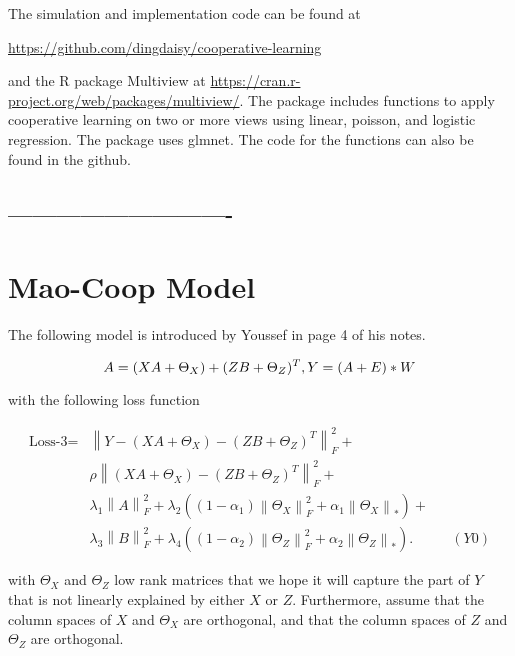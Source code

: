 \documentclass[
]{article}
\begin{document}
The simulation and implementation code can be found at

\url{https://github.com/dingdaisy/cooperative-learning}

and the R package Multiview at
\url{https://cran.r-project.org/web/packages/multiview/}. The package
includes functions to apply cooperative learning on two or more views
using linear, poisson, and logistic regression. The package uses glmnet.
The code for the functions can also be found in the github.

\hypertarget{section}{%
\subsection{----------------------------}\label{section}}

\hypertarget{mao-coop-model}{%
\section{Mao-Coop Model}\label{mao-coop-model}}

The following model is introduced by Youssef in page 4 of his notes.

\begin{equation}
    A = (XA + \Theta_X) + (ZB + \Theta_Z)^T,\\
    Y = (A+E) * W
\end{equation}

with the following loss function

\[
\begin{align}
    \text{Loss-3} =& \left\|  Y - (XA + \Theta_X) - (ZB + \Theta_Z)^T \right\|_F^2 +\\& \rho \left\| (XA + \Theta_X) - (ZB + \Theta_Z)^T \right\|_F^2 +\\
    & \lambda_1 \left\| A \right\|_F^2 + \lambda_2 \left( (1 - \alpha_1) \left\| \Theta_X \right\|_F^2 + \alpha_1 \left\| \Theta_X \right\|_* \right)+\\
    & \lambda_3 \left\| B \right\|_F^2 + \lambda_4 \left( (1 - \alpha_2) \left\| \Theta_Z \right\|_F^2 + \alpha_2 \left\| \Theta_Z \right\|_* \right).&&(Y0)
\end{align}
\]

with \(\Theta_X\) and \(\Theta_Z\) low rank matrices that we hope it
will capture the part of \(Y\) that is not linearly explained by either
\(X\) or \(Z\). Furthermore, assume that the column spaces of \(X\) and
\(\Theta_X\) are orthogonal, and that the column spaces of \(Z\) and
\(\Theta_Z\) are orthogonal.
\end{document}
